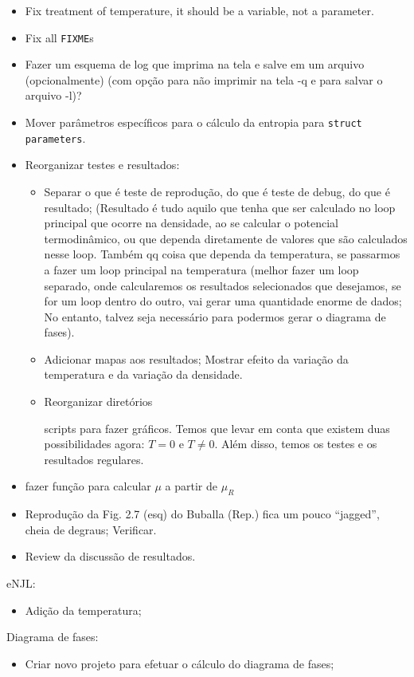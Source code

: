 \begin{itemize}
	\item Fix treatment of temperature, it should be a variable, not a parameter.
	\item Fix all \texttt{FIXME}s
	\item Fazer um esquema de log que imprima na tela e salve em um arquivo (opcionalmente) (com opção para não imprimir na tela -q e para salvar o arquivo -l)?
	\item Mover parâmetros específicos para o cálculo da entropia para \texttt{struct parameters}.
	\item Reorganizar testes e resultados:
		\begin{itemize}
			\item Separar o que é teste de reprodução, do que é teste de debug, do que é resultado; (Resultado é tudo aquilo que tenha que ser calculado no loop principal que ocorre na densidade, ao se calcular o potencial termodinâmico, ou que dependa diretamente de valores que são calculados nesse loop. Também qq coisa que dependa da temperatura, se passarmos a fazer um loop principal na temperatura (melhor fazer um loop separado, onde calcularemos os resultados selecionados que desejamos, se for um loop dentro do outro, vai gerar uma quantidade enorme de dados; No entanto, talvez seja necessário para podermos gerar o diagrama de fases).
			\item Adicionar mapas aos resultados; Mostrar efeito da variação da temperatura e da variação da densidade.
			\item Reorganizar diretórios

		scripts para fazer gráficos. Temos que levar em conta que existem duas possibilidades agora: $T = 0$ e $T \neq 0$. Além disso, temos os testes e os resultados regulares.
		\end{itemize}
	\item fazer função para calcular $\mu$ a partir de $\mu_R$
	\item Reprodução da Fig. 2.7 (esq) do Buballa (Rep.) fica um pouco ``jagged'', cheia de degraus; Verificar.
	\item Review da discussão de resultados.
\end{itemize}

eNJL:
\begin{itemize}
	\item Adição da temperatura;
\end{itemize}

Diagrama de fases:
\begin{itemize}
	\item Criar novo projeto para efetuar o cálculo do diagrama de fases;
\end{itemize}
